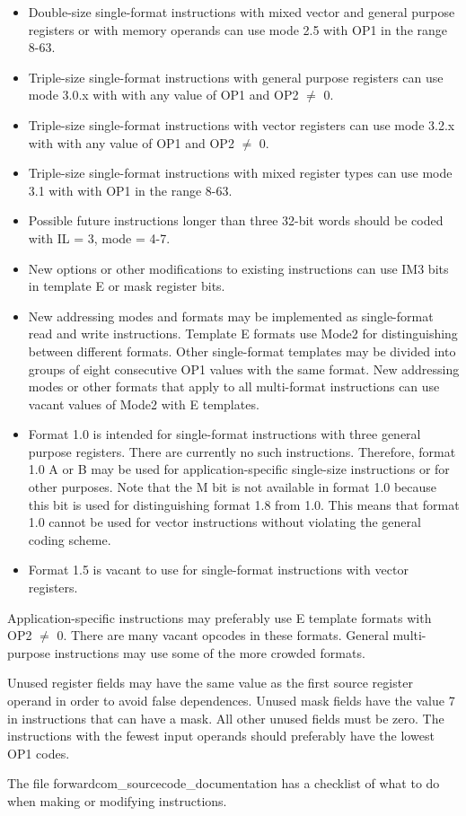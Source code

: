 \documentclass[forwardcom.tex]{subfiles}
\begin{document}
\begin{itemize}
\item Double-size single-format instructions with mixed vector and general purpose registers or with memory operands can use mode 2.5 with OP1 in the range 8-63.

\item Triple-size single-format instructions with general purpose registers can use mode 3.0.x with with any value of OP1 and OP2 $\neq$ 0.

\item Triple-size single-format instructions with vector registers can use mode 3.2.x with with any value of OP1 and OP2 $\neq$ 0.

\item Triple-size single-format instructions with mixed register types can use mode 3.1 with with OP1 in the range 8-63.

\item Possible future instructions longer than three 32-bit words should be coded with IL = 3, mode = 4-7.

\item New options or other modifications to existing instructions can use IM3 bits in template E or mask register bits.

\item New addressing modes and formats may be implemented as single-format read and write instructions. Template E formats use Mode2 for distinguishing between different formats. 
Other single-format templates may be divided into groups of eight consecutive OP1 values with the same format.
New addressing modes or other formats that apply to all multi-format instructions can use vacant values of Mode2 with E templates.

\item Format 1.0 is intended for single-format instructions with three general purpose registers. There are currently no such instructions. Therefore, format 1.0 A or B may be used for application-specific single-size instructions or for other purposes. Note that the M bit is not available in format 1.0 because this bit is used for distinguishing format 1.8 from 1.0. This means that format 1.0 cannot be used for vector instructions without violating the general coding scheme.

\item Format 1.5 is vacant to use for single-format instructions with vector registers.

\end{itemize}

Application-specific instructions may preferably use E template formats with OP2 $\neq$ 0. There are many vacant opcodes in these formats. General multi-purpose instructions may use some of the more crowded formats.
\vv

Unused register fields may have the same value as the first source register operand in order to avoid false dependences. Unused mask fields have the value 7 in instructions that can have a mask.
All other unused fields must be zero. The instructions with the fewest input operands should preferably have the lowest OP1 codes. 
\vv

The file forwardcom\_sourcecode\_documentation has a checklist of what to do when making or modifying instructions.
\vv
\end{document}
